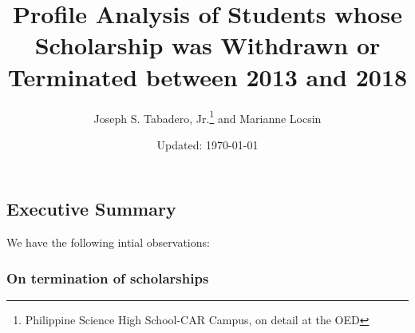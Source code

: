 \documentclass[a4paper]{article}
\title{Profile Analysis of Students whose Scholarship was Withdrawn or
Terminated between 2013 and 2018}
\author{Joseph S. Tabadero,
Jr.\thanks{Philippine Science High School-CAR Campus, on detail at the OED}
and Marianne Locsin}
\date{Updated: \today}
\begin{document}
\maketitle

\hypertarget{executive-summary}{%
\subsection{Executive Summary}\label{executive-summary}}

We have the following intial observations:

\hypertarget{on-termination-of-scholarships}{%
\subsubsection{On termination of
scholarships}\label{on-termination-of-scholarships}}
\end{document}
